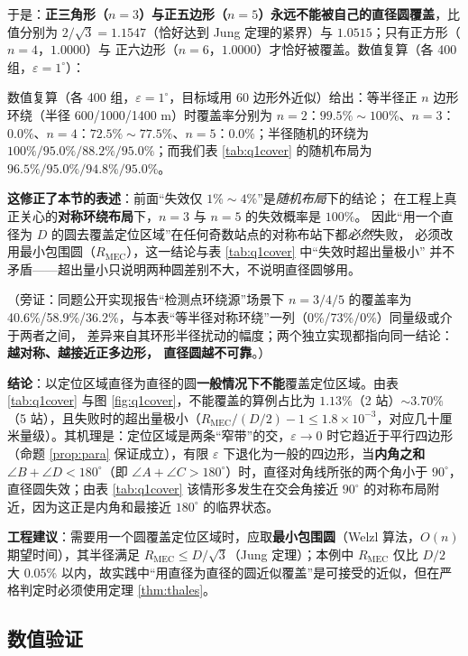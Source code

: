\documentclass{cumcmthesis}
\begin{document}
于是：\textbf{正三角形（$n=3$）与正五边形（$n=5$）永远不能被自己的直径圆覆盖}，比值分别为
$2/\sqrt3=1.1547$（恰好达到 Jung 定理的紧界）与 $1.0515$；只有正方形（$n=4$，$1.0000$）与
正六边形（$n=6$，$1.0000$）才恰好被覆盖。数值复算（各 400 组，$\varepsilon=1^\circ$）：

数值复算（各 400 组，$\varepsilon=1^\circ$，目标域用 60 边形外近似）给出：等半径正 $n$ 边形环绕（半径 600/1000/1400 m）时覆盖率分别为 $n=2$：$99.5\%\sim100\%$、$n=3$：\textbf{$0.0\%$}、$n=4$：$72.5\%\sim77.5\%$、$n=5$：\textbf{$0.0\%$}；半径随机的环绕为 $100\%/95.0\%/88.2\%/95.0\%$；而我们表 \ref{tab:q1cover} 的随机布局为 $96.5\%/95.0\%/94.8\%/95.0\%$。

\textbf{这修正了本节的表述}：前面“失效仅 $1\%\sim4\%$”是\emph{随机布局}下的结论；
在工程上真正关心的\textbf{对称环绕布局}下，$n=3$ 与 $n=5$ 的失效概率是 $100\%$。
因此“用一个直径为 $D$ 的圆去覆盖定位区域”在任何奇数站点的对称布站下都\emph{必然}失败，
必须改用最小包围圆（$R_{\mathrm{MEC}}$），这一结论与表 \ref{tab:q1cover} 中“失效时超出量极小”
并不矛盾——超出量小只说明两种圆差别不大，不说明直径圆够用。

（旁证：同题公开实现\cite{cumcm2026b-gh}报告“检测点环绕源”场景下 $n=3/4/5$ 的覆盖率为
40.6\%/58.9\%/36.2\%，与本表“等半径对称环绕”一列（0\%/73\%/0\%）同量级或介于两者之间，
差异来自其环形半径扰动的幅度；两个独立实现都指向同一结论：\textbf{越对称、越接近正多边形，
直径圆越不可靠}。）

\textbf{结论}：以定位区域直径为直径的圆\textbf{一般情况下不能}覆盖定位区域。由表 \ref{tab:q1cover} 与图 \ref{fig:q1cover}，不能覆盖的算例占比为 $1.13\%$（2 站）$\sim3.70\%$（5 站），且失败时的超出量极小（$R_{\mathrm{MEC}}/(D/2)-1\le1.8\times10^{-3}$，对应几十厘米量级）。其机理是：定位区域是两条“窄带”的交，$\varepsilon\to0$ 时它趋近于平行四边形（命题 \ref{prop:para} 保证成立），有限 $\varepsilon$ 下退化为一般的四边形，当\textbf{内角之和} $\angle B+\angle D<180^{\circ}$（即 $\angle A+\angle C>180^{\circ}$）时，直径对角线所张的两个角小于 $90^{\circ}$，直径圆失效；由表 \ref{tab:q1cover} 该情形多发生在交会角接近 $90^{\circ}$ 的对称布局附近，因为这正是内角和最接近 $180^{\circ}$ 的临界状态。

\textbf{工程建议}：需要用一个圆覆盖定位区域时，应取\textbf{最小包围圆}（Welzl 算法，$O(n)$ 期望时间），其半径满足 $R_{\mathrm{MEC}}\le D/\sqrt3$（Jung 定理）；本例中 $R_{\mathrm{MEC}}$ 仅比 $D/2$ 大 $0.05\%$ 以内，故实践中“用直径为直径的圆近似覆盖”是可接受的近似，但在严格判定时必须使用定理 \ref{thm:thales}。

\subsection{数值验证}
\end{document}
